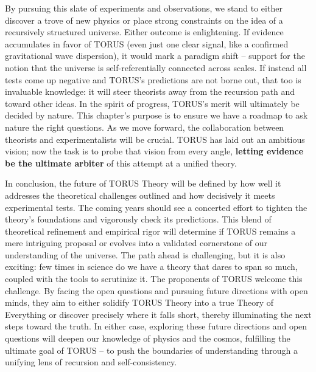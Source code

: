 \documentclass[]{article}
\begin{document}
By pursuing this slate of experiments and observations, we stand to
either discover a trove of new physics or place strong constraints on
the idea of a recursively structured universe. Either outcome is
enlightening. If evidence accumulates in favor of TORUS (even just one
clear signal, like a confirmed gravitational wave dispersion), it would
mark a paradigm shift -- support for the notion that the universe is
self-referentially connected across scales. If instead all tests come up
negative and TORUS's predictions are not borne out, that too is
invaluable knowledge: it will steer theorists away from the recursion
path and toward other ideas. In the spirit of progress, TORUS's merit
will ultimately be decided by nature. This chapter's purpose is to
ensure we have a roadmap to ask nature the right questions. As we move
forward, the collaboration between theorists and experimentalists will
be crucial. TORUS has laid out an ambitious vision; now the task is to
probe that vision from every angle, \textbf{letting evidence be the
ultimate arbiter} of this attempt at a unified theory.

In conclusion, the future of TORUS Theory will be defined by how well it
addresses the theoretical challenges outlined and how decisively it
meets experimental tests. The coming years should see a concerted effort
to tighten the theory's foundations and vigorously check its
predictions. This blend of theoretical refinement and empirical rigor
will determine if TORUS remains a mere intriguing proposal or evolves
into a validated cornerstone of our understanding of the universe. The
path ahead is challenging, but it is also exciting: few times in science
do we have a theory that dares to span so much, coupled with the tools
to scrutinize it. The proponents of TORUS welcome this challenge. By
facing the open questions and pursuing future directions with open
minds, they aim to either solidify TORUS Theory into a true Theory of
Everything or discover precisely where it falls short, thereby
illuminating the next steps toward the truth. In either case, exploring
these future directions and open questions will deepen our knowledge of
physics and the cosmos, fulfilling the ultimate goal of TORUS -- to push
the boundaries of understanding through a unifying lens of recursion and
self-consistency.
\end{document}

